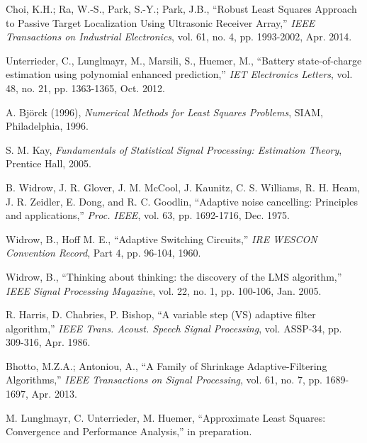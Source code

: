 \documentclass{article}
\begin{document}
\begin{thebibliography}{1}

Choi, K.H.; Ra, W.-S., Park, S.-Y.; Park, J.B., ``Robust Least Squares Approach to Passive Target Localization Using Ultrasonic Receiver Array,''
\emph{IEEE Transactions on Industrial Electronics}, vol. 61, no. 4, pp. 1993-2002, Apr. 2014.

Unterrieder, C., Lunglmayr, M., Marsili, S., Huemer, M., ``Battery state-of-charge estimation using polynomial enhanced prediction,''
\emph{IET Electronics Letters}, vol. 48, no. 21, pp. 1363-1365, Oct. 2012.

A. Bj\"orck (1996), \emph{Numerical Methods for Least Squares Problems}, SIAM, Philadelphia, 1996.

S. M. Kay, \emph{Fundamentals of Statistical Signal Processing: Estimation Theory}, Prentice Hall, 2005.

B.  Widrow, J. R. Glover, J. M. McCool, J. Kaunitz, C.  S.  Williams,
R. H. Heam,  J.  R. Zeidler, E. Dong, and R. C. Goodlin, ``Adaptive
noise cancelling: Principles and applications,''  \emph{Proc.  IEEE},  vol. 63, pp. 1692-1716, Dec. 1975.


Widrow, B., Hoff M. E., ``Adaptive Switching Circuits,'' \emph{IRE WESCON Convention Record}, 
Part 4, pp. 96-104, 1960.

Widrow, B., ``Thinking about thinking: the discovery of the LMS algorithm,'' 
\emph{IEEE Signal Processing Magazine}, vol. 22, no. 1, pp. 100-106, Jan. 2005.

R. Harris, D. Chabries, P. Bishop, ``A variable step
(VS) adaptive filter algorithm,'' \emph{IEEE Trans. Acoust. Speech Signal Processing}, 
vol. ASSP-34, pp. 309-316, Apr. 1986.

Bhotto, M.Z.A.; Antoniou, A., ``A Family of Shrinkage Adaptive-Filtering Algorithms,''
\emph{IEEE Transactions on Signal Processing}, vol. 61, no. 7, pp. 1689-1697, Apr. 2013.

M. Lunglmayr,  C. Unterrieder, M. Huemer, ``Approximate Least Squares: Convergence 
and Performance Analysis,'' in preparation. 

\end{thebibliography}
\end{document}
